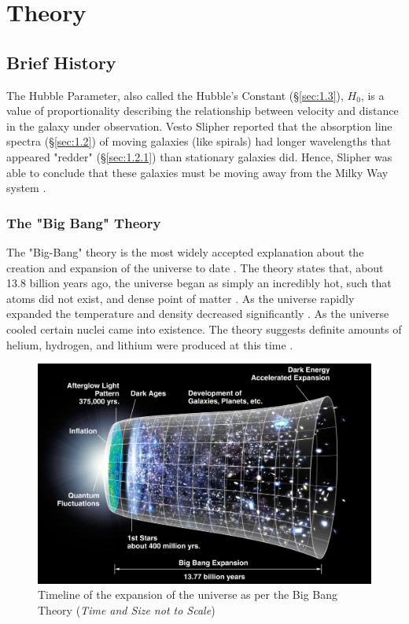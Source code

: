 \documentclass[12pt]{article}
\begin{document}


\section{Theory}

\subsection{Brief History} \label{sec:1.1}

The Hubble Parameter, also called the Hubble's Constant (§\ref{sec:1.3}), $H_0$, is a value of \break
proportionality describing the relationship
between velocity and distance in the galaxy under observation. Vesto Slipher reported that the absorption line spectra (§\ref{sec:1.2}) of moving galaxies
(like spirals) had longer wavelengths that appeared "redder" (§\ref{sec:1.2.1}) than stationary galaxies did. Hence, Slipher was able to conclude 
that these galaxies must be moving away from the Milky Way system
\cite{UCDhubble}.

\subsubsection{The "Big Bang" Theory} \label{sec:1.1.1}

The "Big-Bang" theory is the most widely accepted explanation about the creation and \allowbreak expansion of the universe to date
\cite{britbigbang,spacebigbang}.
The theory states that, about 13.8 billion years ago, the universe began as simply an incredibly hot, such that atoms did not exist, 
and dense point of matter
\cite{britbigbang,spacebigbang,hubblebigbang}.
As the universe rapidly expanded the temperature and density decreased significantly
\cite{britbigbang,hubblebigbang}.
As the universe cooled certain nuclei came into existence. The theory suggests definite amounts of helium, hydrogen, and lithium were produced at this time
\cite{britbigbang}.

\begin{figure}[H]
    \centering
    \includegraphics[width=15cm]{bigbang.jpg}
    \caption{\centering \footnotesize{Timeline of the expansion of the universe as per the Big Bang Theory (\textit{Time and Size not to Scale})} \protect\cite{bigbangpic}}
    \label{fig:bigbang}
\end{figure}
\end{document}
